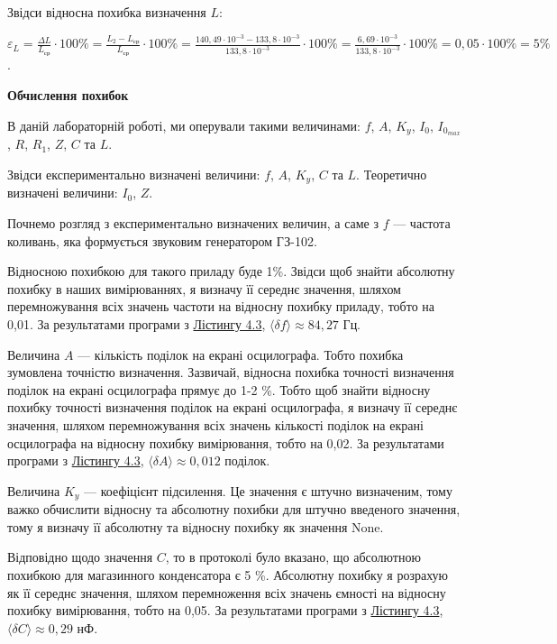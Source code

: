 \documentclass[12pt,a4paper]{article}
\begin{document}
    \vspace{1em}

    Звідси відносна похибка визначення $L$:

    $\displaystyle \varepsilon_L = \frac{\Delta L}{L_{\text{ср}}} \cdot 100\%
    = \frac{L_2 - L_{\text{ср}}}{L_{\text{ср}}} \cdot 100\%
    = \frac{140,49 \cdot 10^{-3} - 133,8 \cdot 10^{-3}}{133,8 \cdot 10^{-3}} \cdot 100\%
    = \frac{6,69 \cdot 10^{-3}}{133,8 \cdot 10^{-3}} \cdot 100\% = 0,05 \cdot 100\% = 5\%$.

    \newpage

    \begin{center}\textbf{\large Обчислення похибок}\end{center}

    В даній лабораторній роботі, ми оперували такими величинами: $f$, $A$, $K_y$, $I_0$, $I_{0_{max}}$, $R$, $R_1$, $Z$, $C$ та $L$.

    Звідси експериментально визначені величини: $f$, $A$, $K_y$, $C$ та $L$. Теоретично визначені величини: $I_0$, $Z$.

    Почнемо розгляд з експериментально визначених величин, а саме з $f$ --- частота коливань, яка формується звуковим генератором ГЗ-102.

    Відносною похибкою для такого приладу буде 1\%. Звідси щоб знайти абсолютну похибку в наших вимірюваннях, я визначу її середнє значення, шляхом перемножування всіх значень
    частоти на відносну похибку приладу, тобто на 0,01. За результатами програми з \hyperlink{listing3}{Лістингу 4.3}, $\text{⟨}\delta f\text{⟩} \approx 84,27$ Гц.

    Величина $A$ --- кількість поділок на екрані осцилографа. Тобто похибка зумовлена точністю визначення. Зазвичай, відносна похибка точності визначення поділок на
    екрані осцилографа прямує до 1-2 \%. Тобто щоб знайти відносну похибку точності визначення поділок на екрані осцилографа,
    я визначу її середнє значення, шляхом перемножування всіх значень кількості поділок на екрані осцилографа на відносну похибку вимірювання, тобто на 0,02.
    За результатами програми з \hyperlink{listing3}{Лістингу 4.3}, $\text{⟨}\delta A\text{⟩} \approx 0,012$ поділок.

    Величина $K_y$ --- коефіцієнт підсилення. Це значення є штучно визначеним, тому важко обчислити відносну та абсолютну похибки для штучно введеного значення, тому
    я визначу її абсолютну та відносну похибку як значення None.

    Відповідно щодо значення $C$, то в протоколі було вказано, що абсолютною похибкою для магазинного конденсатора є 5 \%. Абсолютну похибку я
    розрахую як її середнє значення, шляхом перемноження всіх значень ємності на відносну похибку вимірювання, тобто на 0,05.
    За результатами програми з \hyperlink{listing3}{Лістингу 4.3}, $\text{⟨}\delta C\text{⟩} \approx 0,29$ нФ.
\end{document}
